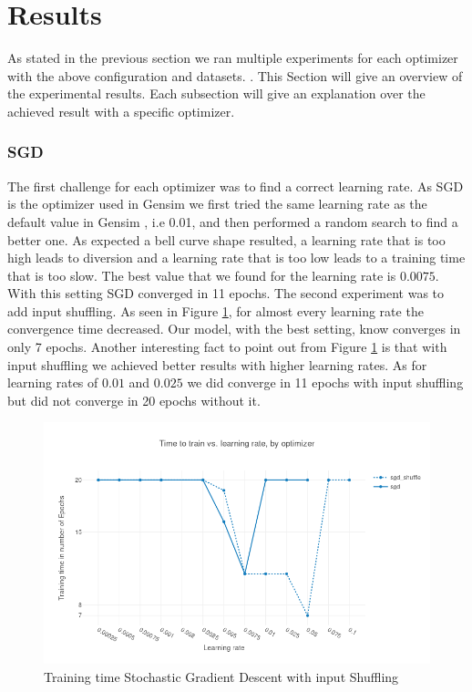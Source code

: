 

\section{Results}\label{sec:results}
As stated in the previous section we ran multiple experiments for each optimizer with the above configuration and datasets. . This Section will  give an overview of the experimental results. Each subsection will give an explanation over the achieved result with a specific optimizer.

\subsubsection{SGD}
The first challenge for each optimizer was to find a correct learning rate. As SGD is the optimizer used in Gensim \citep{gensim} we first tried the same learning rate as the default value in Gensim \citep{gensim}, i.e 0.01,  and then performed a random search to find a better one. As expected a bell curve shape resulted, a learning rate that is too high leads to diversion and a learning rate that is too low leads to a training time that is too slow. The best value that we found for the learning rate is $0.0075$. With this setting SGD converged in 11 epochs. The second experiment was to add input shuffling.
As seen in Figure \ref{fig:results_sgd}, for almost every learning rate the convergence time decreased. Our model, with the best setting, know converges in only 7 epochs. Another interesting fact to point out from Figure \ref{fig:results_sgd} is that with input shuffling we achieved better results with higher learning rates. As for learning rates of $0.01$ and $0.025$ we did converge in 11 epochs with input shuffling but did not converge in 20 epochs without it.

\begin{figure}[h]
\centering
\includegraphics[scale=0.3]{images/results_sgd_shuffle}
\caption{Training time Stochastic Gradient Descent with input Shuffling}
\label{fig:results_sgd}
\end{figure}
\iffalse 
